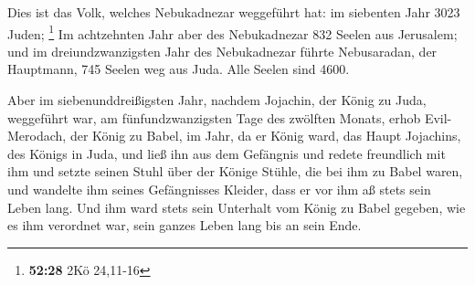  Dies ist das Volk, welches Nebukadnezar weggeführt hat: im
siebenten Jahr 3023 Juden; \footnote{\textbf{52:28} 2Kö 24,11-16}
 Im achtzehnten Jahr aber des Nebukadnezar 832 Seelen aus
Jerusalem;  und im dreiundzwanzigsten Jahr des Nebukadnezar
führte Nebusaradan, der Hauptmann, 745 Seelen weg aus Juda. Alle Seelen
sind 4600.

 Aber im siebenunddreißigsten Jahr, nachdem Jojachin, der
König zu Juda, weggeführt war, am fünfundzwanzigsten Tage des zwölften
Monats, erhob Evil-Merodach, der König zu Babel, im Jahr, da er König
ward, das Haupt Jojachins, des Königs in Juda, und ließ ihn aus dem
Gefängnis  und redete freundlich mit ihm und setzte seinen
Stuhl über der Könige Stühle, die bei ihm zu Babel waren, 
und wandelte ihm seines Gefängnisses Kleider, dass er vor ihm aß stets
sein Leben lang.  Und ihm ward stets sein Unterhalt vom
König zu Babel gegeben, wie es ihm verordnet war, sein ganzes Leben lang
bis an sein Ende.
